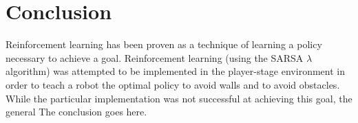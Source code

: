 \documentclass[conference]{IEEEtran}
\begin{document}
%
%


%



\section{Conclusion}
Reinforcement learning has been proven as a technique of learning a policy necessary to achieve a goal. 
Reinforcement learning (using the SARSA $\lambda$ algorithm) was attempted to be implemented in the player-stage environment in order to teach a robot the optimal policy to avoid walls and to avoid obstacles.
While the particular implementation was not successful at achieving this goal, the general 
The conclusion goes here.
\end{document}
